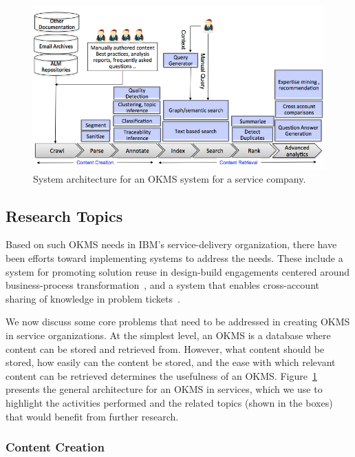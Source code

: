 \begin{figure}
	\center
	\includegraphics[scale=0.45]{figs/km.png}
        \vspace*{-10pt}
	\caption{System architecture for an OKMS system for a service company.}
        \vspace*{-10pt}
	\label{fig-km}
\end{figure}

\subsection{Research Topics}

Based on such OKMS needs in IBM's service-delivery organization, there have been
efforts toward implementing systems to address the needs. These include a system
for promoting solution reuse in design-build engagements centered around
business-process transformation~\cite{Goodwin:2012b}, and a system that enables
cross-account sharing of knowledge in problem tickets~\cite{Majumdar:2011}.

We now discuss some core problems that need to be addressed in creating OKMS in
service organizations. At the simplest level, an OKMS is a database where
content can be stored and retrieved from. However, what content should be
stored, how easily can the content be stored, and the ease with which relevant
content can be retrieved determines the usefulness of an OKMS.
Figure~\ref{fig-km} presents the general architecture for an OKMS in services,
which we use to highlight the activities performed and the related topics (shown
in the boxes) that would benefit from further research.

\subsubsection{Content Creation}

